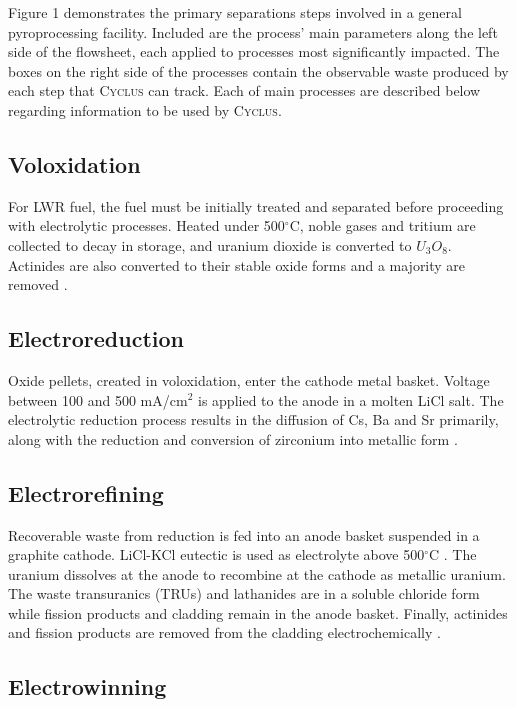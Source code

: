 \documentclass{anstrans}
\newcommand{\Cyclus}{\textsc{Cyclus}\xspace}%
\begin{document}
Figure 1 demonstrates the primary separations steps involved in a general pyroprocessing facility. Included are the process' main parameters along the left side of the flowsheet, each applied to processes most significantly impacted. The boxes on the right side of the processes contain the observable waste produced by each step that \Cyclus can track. Each of main processes are described below regarding information to be used by \Cyclus.

\subsection{Voloxidation}

For LWR fuel, the fuel must be initially treated and separated before proceeding with electrolytic processes. Heated under 500$^{\circ}$C, noble gases and tritium are collected to decay in storage, and uranium dioxide is converted to $U_3O_8$. Actinides are also converted to their stable oxide forms and a majority are removed \cite{flowsheet_1998}. 

\subsection{Electroreduction}

Oxide pellets, created in voloxidation, enter the cathode metal basket. Voltage between 100 and 500 mA/cm$^2$ is applied to the anode in a molten LiCl salt. The electrolytic reduction process results in the diffusion of Cs, Ba and Sr primarily, along with the reduction and conversion of zirconium into metallic form \cite{choi_electrochemical_2015,flowsheet_1998}.

\subsection{Electrorefining}

Recoverable waste from reduction is fed into an anode basket suspended in a graphite cathode. LiCl-KCl eutectic is used as electrolyte above 500$^{\circ}$C \cite{flowsheet_1998,lee_korean_2011}. The uranium dissolves at the anode to recombine at the cathode as metallic uranium. The waste transuranics (TRUs) and lathanides are in a soluble chloride form  while fission products and cladding remain in the anode basket. Finally, actinides and fission products are removed from the cladding electrochemically \cite{lee_korean_2011}.

\subsection{Electrowinning}
\end{document}
